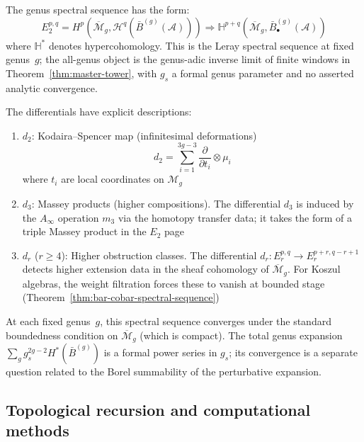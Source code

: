 \begin{spectralsequence}\label{ss:genus}
The genus spectral sequence has the form:
\[E_2^{p,q} = H^p(\overline{\mathcal{M}}_g, \mathcal{H}^q(\bar{B}^{(g)}(\mathcal{A}))) \Rightarrow \mathbb{H}^{p+q}(\overline{\mathcal{M}}_g, \bar{B}^{(g)}_\bullet(\mathcal{A}))\]
where $\mathbb{H}^*$ denotes hypercohomology.
This is the Leray spectral sequence at fixed genus~$g$; the
all-genus object is the genus-adic inverse limit of finite windows in
Theorem~\ref{thm:master-tower}, with $g_s$ a formal genus parameter
and no asserted analytic convergence.

The differentials have explicit descriptions:
\begin{enumerate}
\item $d_2$: Kodaira--Spencer map (infinitesimal deformations)
\[d_2 = \sum_{i=1}^{3g-3} \frac{\partial}{\partial t_i} \otimes \mu_i\]
where $t_i$ are local coordinates on $\mathcal{M}_g$

\item $d_3$: Massey products (higher compositions).
The differential $d_3$ is induced by the $A_\infty$ operation $m_3$ via the homotopy
transfer data; it takes the form of a triple Massey product in the $E_2$ page

\item $d_r$ ($r \geq 4$): Higher obstruction classes. The differential $d_r\colon E_r^{p,q} \to E_r^{p+r,q-r+1}$ detects higher extension data in the sheaf cohomology of $\overline{\mathcal{M}}_g$. For Koszul algebras, the weight filtration forces these to vanish at bounded stage (Theorem~\ref{thm:bar-cobar-spectral-sequence})
\end{enumerate}

At each fixed genus~$g$, this spectral sequence converges under the standard boundedness condition on $\overline{\mathcal{M}}_g$ (which is compact). The total genus expansion $\sum_g g_s^{2g-2} H^*(\bar{B}^{(g)})$ is a formal power series in $g_s$; its convergence is a separate question related to the Borel summability of the perturbative expansion.
\end{spectralsequence}


\subsection{Topological recursion and computational methods}\label{subsec:recursion}

